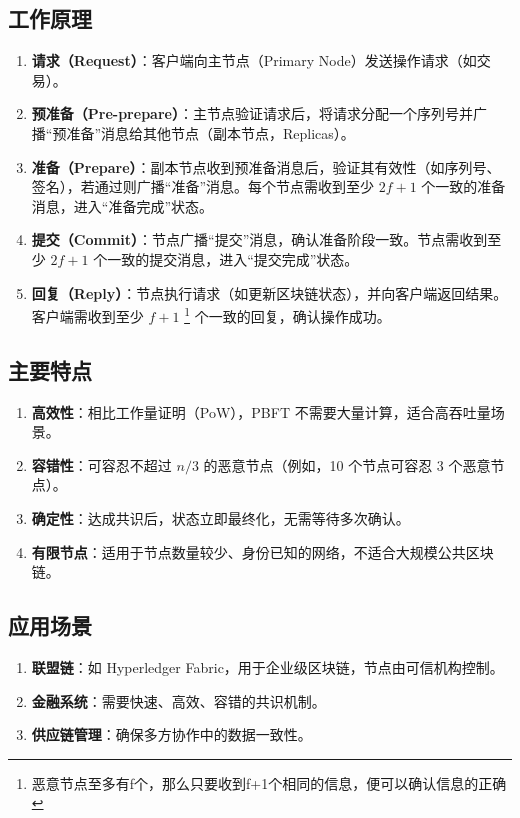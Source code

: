 \documentclass[12pt]{ctexart}
\begin{document}
\subsection{工作原理}
\begin{enumerate}
    \item \textbf{请求（Request）}：客户端向主节点（Primary Node）发送操作请求（如交易）。
    \item \textbf{预准备（Pre-prepare）}：主节点验证请求后，将请求分配一个序列号并广播“预准备”消息给其他节点（副本节点，Replicas）。
    \item \textbf{准备（Prepare）}：副本节点收到预准备消息后，验证其有效性（如序列号、签名），若通过则广播“准备”消息。每个节点需收到至少 \( 2f + 1 \) 个一致的准备消息，进入“准备完成”状态。
    \item \textbf{提交（Commit）}：节点广播“提交”消息，确认准备阶段一致。节点需收到至少 \( 2f + 1 \) 个一致的提交消息，进入“提交完成”状态。
    \item \textbf{回复（Reply）}：节点执行请求（如更新区块链状态），并向客户端返回结果。客户端需收到至少 \( f + 1 \) \footnote{恶意节点至多有f个，那么只要收到f+1个相同的信息，便可以确认信息的正确} 个一致的回复，确认操作成功。
\end{enumerate}

\subsection{主要特点}
\begin{enumerate}
    \item \textbf{高效性}：相比工作量证明（PoW），PBFT 不需要大量计算，适合高吞吐量场景。
    \item \textbf{容错性}：可容忍不超过 \( n/3 \) 的恶意节点（例如，10 个节点可容忍 3 个恶意节点）。
    \item \textbf{确定性}：达成共识后，状态立即最终化，无需等待多次确认。
    \item \textbf{有限节点}：适用于节点数量较少、身份已知的网络，不适合大规模公共区块链。
\end{enumerate}

\subsection{应用场景}
\begin{enumerate}
    \item \textbf{联盟链}：如 Hyperledger Fabric，用于企业级区块链，节点由可信机构控制。
    \item \textbf{金融系统}：需要快速、高效、容错的共识机制。
    \item \textbf{供应链管理}：确保多方协作中的数据一致性。
\end{enumerate}
\end{document}

